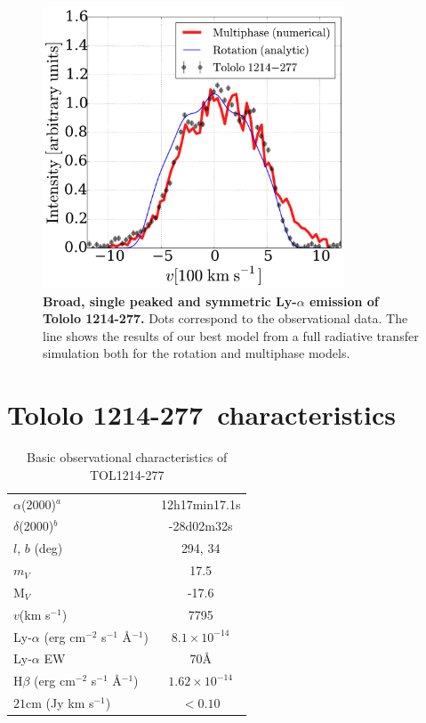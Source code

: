 \documentclass[a4paper, usenatbib, 12pt]{article}
\newcommand{\tol}{Tololo 1214-277}
\begin{document}
{\begin{figure}
\begin{center}
\includegraphics[width=0.8\textwidth]{CLARA-TOL-main.pdf}
\caption{{\bf Broad, single peaked and symmetric Ly-$\alpha$ emission of \tol.}
  Dots correspond to the observational data. The line shows the results
of our best model from a full radiative transfer simulation both for
the rotation and multiphase models.} 
\end{center}
\end{figure}

{}


\newpage 

\section*{\tol\ characteristics}


\begin{table}
\begin{center}
\begin{tabular}{lc}
$\alpha$(2000)$^{a}$ & 12h17min17.1s\\
$\delta$(2000)$^{b}$ & -28d02m32s\\
$l$, $b$ (deg) & 294, 34\\
$m_V$ & 17.5\\
  M$_V$ & -17.6\\ 
$v$(km s$^{-1}$) & 7795\\
Ly-$\alpha$ (erg cm$^{-2}$ s$^{-1}$ \AA$^{-1}$)& $8.1\times 10^{-14}$ \\
Ly-$\alpha$ EW & $70$\AA\\
H$\beta$ (erg cm$^{-2}$ s$^{-1}$ \AA$^{-1}$) & $1.62\times 10^{-14}$ \\
$21$cm (Jy km s$^{-1}$)& $<0.10$ \\
\end{tabular}
\end{center}
\caption{Basic observational characteristics of TOL1214-277
  \cite{Thuan97}\\} 
\end{table}


}
\end{document}
